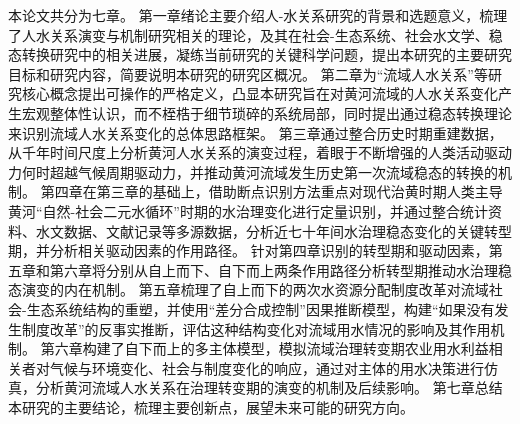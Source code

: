 本论文共分为七章。
第一章绪论主要介绍人-水关系研究的背景和选题意义，梳理了人水关系演变与机制研究相关的理论，及其在社会-生态系统、社会水文学、稳态转换研究中的相关进展，凝练当前研究的关键科学问题，提出本研究的主要研究目标和研究内容，简要说明本研究的研究区概况。
第二章为“流域人水关系”等研究核心概念提出可操作的严格定义，凸显本研究旨在对黄河流域的人水关系变化产生宏观整体性认识，而不桎梏于细节琐碎的系统局部，同时提出通过稳态转换理论来识别流域人水关系变化的总体思路框架。
第三章通过整合历史时期重建数据，从千年时间尺度上分析黄河人水关系的演变过程，着眼于不断增强的人类活动驱动力何时超越气候周期驱动力，并推动黄河流域发生历史第一次流域稳态的转换的机制。
第四章在第三章的基础上，借助断点识别方法重点对现代治黄时期人类主导黄河“自然-社会二元水循环”时期的水治理变化进行定量识别，并通过整合统计资料、水文数据、文献记录等多源数据，分析近七十年间水治理稳态变化的关键转型期，并分析相关驱动因素的作用路径。
针对第四章识别的转型期和驱动因素，第五章和第六章将分别从自上而下、自下而上两条作用路径分析转型期推动水治理稳态演变的内在机制。
第五章梳理了自上而下的两次水资源分配制度改革对流域社会-生态系统结构的重塑，并使用“差分合成控制”因果推断模型，构建“如果没有发生制度改革”的反事实推断，评估这种结构变化对流域用水情况的影响及其作用机制。
第六章构建了自下而上的多主体模型，模拟流域治理转变期农业用水利益相关者对气候与环境变化、社会与制度变化的响应，通过对主体的用水决策进行仿真，分析黄河流域人水关系在治理转变期的演变的机制及后续影响。
第七章总结本研究的主要结论，梳理主要创新点，展望未来可能的研究方向。